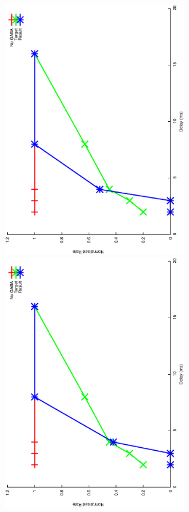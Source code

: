 \documentclass{article}
\begin{document}
\includegraphics[keepaspectratio=true,angle=-90,width=0.6\textwidth]{DS_ClickRecovery_result.27.eps}\clearpage
\includegraphics[keepaspectratio=true,angle=-90,width=0.6\textwidth]{DS_ClickRecovery_result.28.eps}\clearpage
\end{document}
